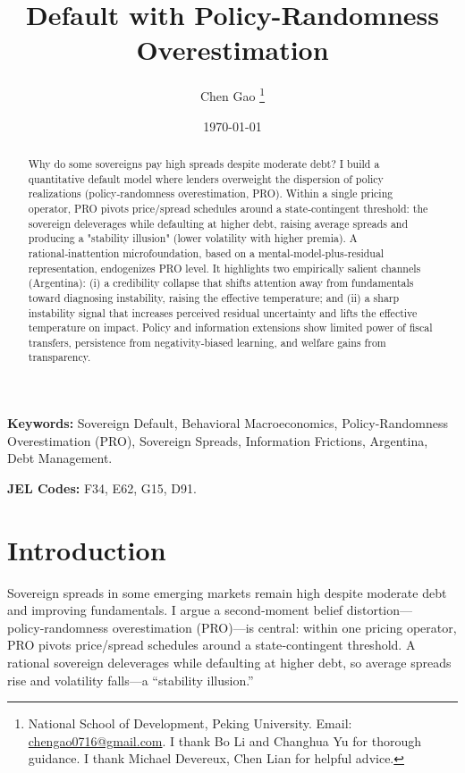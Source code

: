 \documentclass[12pt]{article}
\title{Default with Policy-Randomness Overestimation}
\author{Chen Gao \thanks{National School of Development, Peking University. Email: \url{chengao0716@gmail.com}. I thank Bo Li and Changhua Yu for thorough guidance. I thank Michael Devereux, Chen Lian for helpful advice.}}
\date{ \today}
\theoremstyle{plain}
\begin{document}
\maketitle

\begin{abstract}
	Why do some sovereigns pay high spreads despite moderate debt? I build a quantitative default model where lenders overweight the dispersion of policy realizations (policy‑randomness overestimation, PRO). Within a single pricing operator, PRO pivots price/spread schedules around a state‑contingent threshold: the sovereign deleverages while defaulting at higher debt, raising average spreads and producing a "stability illusion" (lower volatility with higher premia). A rational‑inattention microfoundation, based on a mental‑model‑plus‑residual representation, endogenizes PRO level. It highlights two empirically salient channels (Argentina): (i) a credibility collapse that shifts attention away from fundamentals toward diagnosing instability, raising the effective temperature; and (ii) a sharp instability signal that increases perceived residual uncertainty and lifts the effective temperature on impact. Policy and information extensions show limited power of fiscal transfers, persistence from negativity‑biased learning, and welfare gains from transparency.
\end{abstract}

\noindent \textbf{Keywords:} Sovereign Default, Behavioral Macroeconomics, Policy-Randomness Overestimation (PRO), Sovereign Spreads, Information Frictions, Argentina, Debt Management.

\noindent \textbf{JEL Codes:} F34, E62, G15, D91.

\clearpage

\section{Introduction}
\label{sec:intro}

Sovereign spreads in some emerging markets remain high despite moderate debt
and improving fundamentals. I argue a second‑moment belief
distortion—policy‑randomness overestimation (PRO)—is central: within one
pricing operator, PRO pivots price/spread schedules around a state‑contingent
threshold. A rational sovereign deleverages while defaulting at higher debt, so
average spreads rise and volatility falls—a “stability illusion.”
\end{document}
